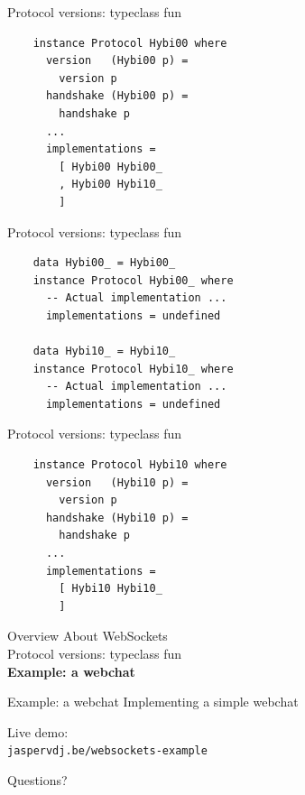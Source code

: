 \documentclass[20pt]{beamer}
\newcommand{\vspaced}{
    \vspace{5mm}
}
\begin{document}
\begin{frame}[fragile]{Protocol versions: typeclass fun}
    \begin{lstlisting}
    instance Protocol Hybi00 where
      version   (Hybi00 p) =
        version p
      handshake (Hybi00 p) =
        handshake p
      ...
      implementations =
        [ Hybi00 Hybi00_
        , Hybi00 Hybi10_
        ]
    \end{lstlisting}
\end{frame}

\begin{frame}[fragile]{Protocol versions: typeclass fun}
    \begin{lstlisting}
    data Hybi00_ = Hybi00_
    instance Protocol Hybi00_ where
      -- Actual implementation ...
      implementations = undefined

    data Hybi10_ = Hybi10_
    instance Protocol Hybi10_ where
      -- Actual implementation ...
      implementations = undefined
    \end{lstlisting}
\end{frame}

\begin{frame}[fragile]{Protocol versions: typeclass fun}
    \begin{lstlisting}
    instance Protocol Hybi10 where
      version   (Hybi10 p) =
        version p
      handshake (Hybi10 p) =
        handshake p
      ...
      implementations =
        [ Hybi10 Hybi10_
        ]
    \end{lstlisting}
\end{frame}


\begin{frame}{Overview}
    About WebSockets \\
    Protocol versions: typeclass fun \\
    \textbf{Example: a webchat} \\
\end{frame}

\begin{frame}[fragile]{Example: a webchat}
    Implementing a simple webchat \\
    \vspaced
    Live demo: \\
    \small{\verb#jaspervdj.be/websockets-example#}
\end{frame}


\begin{frame}[plain]
    \begin{center}
    \huge{Questions?}
    \end{center}
\end{frame}

\end{document}
